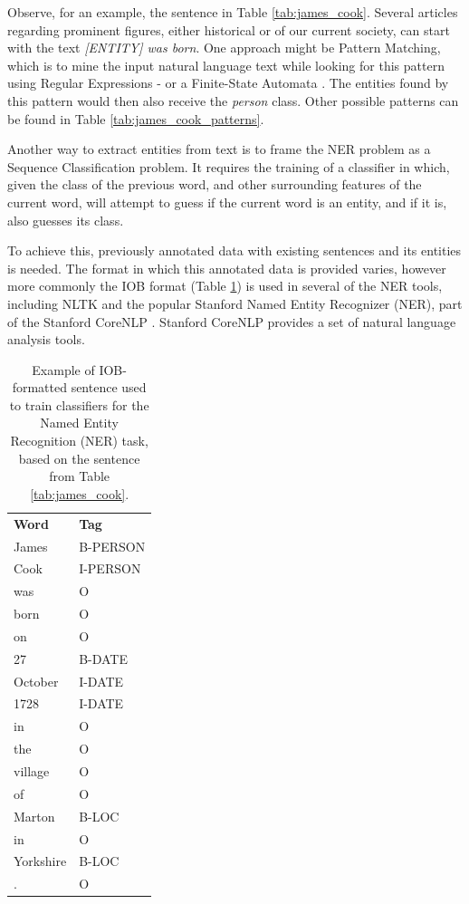 \documentclass[11pt,a4paper,openright]{memoir}
\begin{document}
Observe, for an example, the sentence in Table \ref{tab:james_cook}. Several articles regarding prominent figures, either historical or of our current society, can start with the text \emph{[ENTITY] was born}. One approach might be Pattern Matching, which is to mine the input natural language text while looking for this pattern using Regular Expressions - or a Finite-State Automata \cite{Jurafsky:2000:SLP:555733}. The entities found by this pattern would then also receive the \emph{person} class. Other possible patterns can be found in Table \ref{tab:james_cook_patterns}.

Another way to extract entities from text is to frame the NER problem as a Sequence Classification problem. It requires the training of a classifier in which, given the class of the previous word, and other surrounding features of the current word, will attempt to guess if the current word is an entity, and if it is, also guesses its class.

To achieve this, previously annotated data with existing sentences and its entities is needed. The format in which this annotated data is provided varies, however more commonly the IOB format (Table \ref{tab:james_cook_iob}) is used in several of the NER tools, including NLTK \cite{BirdKleinLoper09} and the popular Stanford Named Entity Recognizer (NER), part of the Stanford CoreNLP \cite{manning-EtAl:2014:P14-5}. Stanford CoreNLP provides a set of natural language analysis tools.

\begin{table}[!htbp]
  \centering
    \begin{tabular}{ll}
      \textbf{Word}          & \textbf{Tag} \\
      James                  & B-PERSON \\
      Cook                   & I-PERSON \\
      was                    & O \\
      born                   & O \\
      on                     & O \\
      27                     & B-DATE \\
      October                & I-DATE \\
      1728                   & I-DATE \\
      in                     & O \\
      the                    & O \\
      village                & O \\
      of                     & O \\
      Marton                 & B-LOC \\
      in                     & O \\
      Yorkshire              & B-LOC \\
      .                      & O \\
    \end{tabular}
  \caption[IOB-formatted sentence.]{Example of IOB-formatted sentence used to train classifiers for the Named Entity Recognition (NER) task, based on the sentence from Table \ref{tab:james_cook}.}
  \label{tab:james_cook_iob}
\end{table}
\end{document}
